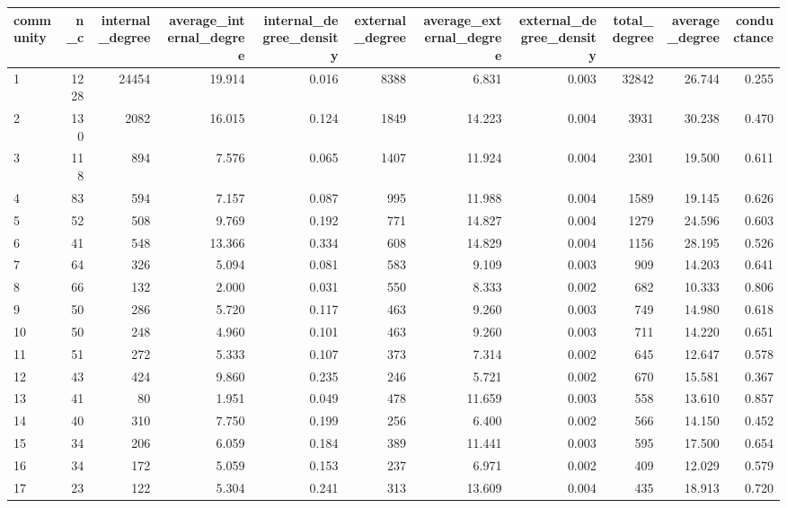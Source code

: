 \begin{table}[ht]
\centering
\begin{adjustbox}{max width=\textwidth}
\begin{tabular}{lrrrrrrrrrr}
  \hline
community & n\_c & internal\_degree & average\_internal\_degree & internal\_degree\_density & external\_degree & average\_external\_degree & external\_degree\_density & total\_degree & average\_degree & conductance \\ 
  \hline
1 & 1228 & 24454 & 19.914 & 0.016 & 8388 & 6.831 & 0.003 & 32842 & 26.744 & 0.255 \\ 
  2 & 130 & 2082 & 16.015 & 0.124 & 1849 & 14.223 & 0.004 & 3931 & 30.238 & 0.470 \\ 
  3 & 118 & 894 & 7.576 & 0.065 & 1407 & 11.924 & 0.004 & 2301 & 19.500 & 0.611 \\ 
  4 & 83 & 594 & 7.157 & 0.087 & 995 & 11.988 & 0.004 & 1589 & 19.145 & 0.626 \\ 
  5 & 52 & 508 & 9.769 & 0.192 & 771 & 14.827 & 0.004 & 1279 & 24.596 & 0.603 \\ 
  6 & 41 & 548 & 13.366 & 0.334 & 608 & 14.829 & 0.004 & 1156 & 28.195 & 0.526 \\ 
  7 & 64 & 326 & 5.094 & 0.081 & 583 & 9.109 & 0.003 & 909 & 14.203 & 0.641 \\ 
  8 & 66 & 132 & 2.000 & 0.031 & 550 & 8.333 & 0.002 & 682 & 10.333 & 0.806 \\ 
  9 & 50 & 286 & 5.720 & 0.117 & 463 & 9.260 & 0.003 & 749 & 14.980 & 0.618 \\ 
  10 & 50 & 248 & 4.960 & 0.101 & 463 & 9.260 & 0.003 & 711 & 14.220 & 0.651 \\ 
  11 & 51 & 272 & 5.333 & 0.107 & 373 & 7.314 & 0.002 & 645 & 12.647 & 0.578 \\ 
  12 & 43 & 424 & 9.860 & 0.235 & 246 & 5.721 & 0.002 & 670 & 15.581 & 0.367 \\ 
  13 & 41 & 80 & 1.951 & 0.049 & 478 & 11.659 & 0.003 & 558 & 13.610 & 0.857 \\ 
  14 & 40 & 310 & 7.750 & 0.199 & 256 & 6.400 & 0.002 & 566 & 14.150 & 0.452 \\ 
  15 & 34 & 206 & 6.059 & 0.184 & 389 & 11.441 & 0.003 & 595 & 17.500 & 0.654 \\ 
  16 & 34 & 172 & 5.059 & 0.153 & 237 & 6.971 & 0.002 & 409 & 12.029 & 0.579 \\ 
  17 & 23 & 122 & 5.304 & 0.241 & 313 & 13.609 & 0.004 & 435 & 18.913 & 0.720 \\ 

\end{tabular}
\end{adjustbox}
\end{table}
